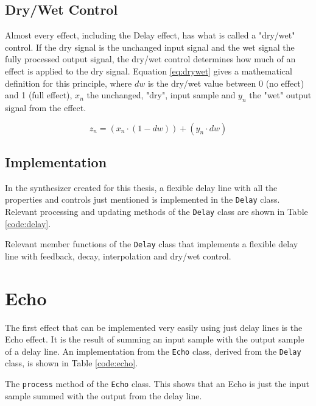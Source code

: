 \documentclass[12pt,twoside]{report}
\begin{document}
\subsection{Dry/Wet Control}

Almost every effect, including the Delay effect, has what is called a "dry/wet" control. If the dry signal is the unchanged input signal and the wet signal the fully processed output signal, the dry/wet control determines how much of an effect is applied to the dry signal. Equation \ref{eq:drywet} gives a mathematical definition for this principle, where $dw$ is the dry/wet value between 0 (no effect) and 1 (full effect), $x_{n}$ the unchanged, "dry", input sample and $y_{n}$ the "wet" output signal from the effect.

\begin{equation}
  z_{n} = (x_{n} \cdot (1 - dw)) + (y_{n} \cdot dw)
  \label{eq:drywet}
\end{equation}

\subsection{Implementation}

In the synthesizer created for this thesis, a flexible delay line with all the properties and controls just mentioned is implemented in the \texttt{Delay} class. Relevant processing and updating methods of the \texttt{Delay} class are shown in Table \ref{code:delay}.

\begin{table}[thb!]
  \caption{Relevant member functions of the \texttt{Delay} class that implements a flexible delay line with feedback, decay, interpolation and dry/wet control.}
  \label{code:delay}
\end{table}

\pagebreak

\section{Echo}

The first effect that can be implemented very easily using just delay lines is the Echo effect. It is the result of summing an input sample with the output sample of a delay line. An implementation from the \texttt{Echo} class, derived from the \texttt{Delay} class, is shown in Table \ref{code:echo}.

\begin{table}[h!]
  \caption{The \texttt{process} method of the \texttt{Echo} class. This shows that an Echo is just the input sample summed with the output from the delay line.}
  \label{code:echo}
\end{table}
\end{document}
